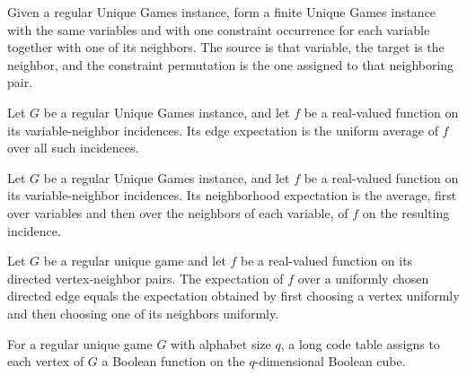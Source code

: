 \begin{definition}
\label{FABL.RegularUniqueGame.toFiniteUniqueGame}
\leanok
{}
Given a regular Unique Games instance, form a finite Unique Games instance with the same
variables and with one constraint occurrence for each variable together with one of its
neighbors. The source is that variable, the target is the neighbor, and the constraint
permutation is the one assigned to that neighboring pair.
\end{definition}

\begin{definition}
\label{FABL.RegularUniqueGame.edgeExpectation}
\leanok
Let $G$ be a regular Unique Games instance, and let $f$ be a real-valued function on its
variable-neighbor incidences. Its edge expectation is the uniform average of $f$ over
all such incidences.
\end{definition}

\begin{definition}
\label{FABL.RegularUniqueGame.neighborhoodExpectation}
\leanok
Let $G$ be a regular Unique Games instance, and let $f$ be a real-valued function on its
variable-neighbor incidences. Its neighborhood expectation is the average, first over
variables and then over the neighbors of each variable, of $f$ on the resulting
incidence.
\end{definition}

\begin{theorem}
\label{FABL.RegularUniqueGame.edgeExpectation_eq_neighborhoodExpectation}
\leanok
{}
Let $G$ be a regular unique game and let $f$ be a real-valued function on its directed
vertex-neighbor pairs. The expectation of $f$ over a uniformly chosen directed edge
equals the expectation obtained by first choosing a vertex uniformly and then choosing
one of its neighbors uniformly.
\end{theorem}

\begin{definition}
\label{FABL.RegularUniqueGame.LongCodeTable}
\leanok
{}
For a regular unique game $G$ with alphabet size $q$, a long code table assigns to each
vertex of $G$ a Boolean function on the $q$-dimensional Boolean cube.
\end{definition}

